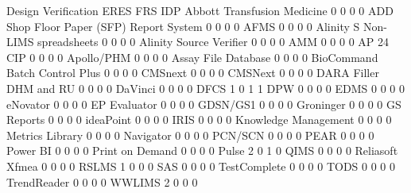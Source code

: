 \documentclass{article}
\begin{document}
\begin{Schunk}
\begin{Soutput}
                                           Design Verification ERES FRS IDP
  Abbott Transfusion Medicine                                0    0   0   0
  ADD Shop Floor Paper (SFP) Report System                   0    0   0   0
  AFMS                                                       0    0   0   0
  Alinity S Non-LIMS spreadsheets                            0    0   0   0
  Alinity Source Verifier                                    0    0   0   0
  AMM                                                        0    0   0   0
  AP 24 CIP                                                  0    0   0   0
  Apollo/PHM                                                 0    0   0   0
  Assay File Database                                        0    0   0   0
  BioCommand Batch Control Plus                              0    0   0   0
  CMSnext                                                    0    0   0   0
  CMSNext                                                    0    0   0   0
  DARA Filler DHM and RU                                     0    0   0   0
  DaVinci                                                    0    0   0   0
  DFCS                                                       1    0   1   1
  DPW                                                        0    0   0   0
  EDMS                                                       0    0   0   0
  eNovator                                                   0    0   0   0
  EP Evaluator                                               0    0   0   0
  GDSN/GS1                                                   0    0   0   0
  Groninger                                                  0    0   0   0
  GS Reports                                                 0    0   0   0
  ideaPoint                                                  0    0   0   0
  IRIS                                                       0    0   0   0
  Knowledge Management                                       0    0   0   0
  Metrics Library                                            0    0   0   0
  Navigator                                                  0    0   0   0
  PCN/SCN                                                    0    0   0   0
  PEAR                                                       0    0   0   0
  Power BI                                                   0    0   0   0
  Print on Demand                                            0    0   0   0
  Pulse                                                      2    0   1   0
  QIMS                                                       0    0   0   0
  Reliasoft Xfmea                                            0    0   0   0
  RSLMS                                                      1    0   0   0
  SAS                                                        0    0   0   0
  TestComplete                                               0    0   0   0
  TODS                                                       0    0   0   0
  TrendReader                                                0    0   0   0
  WWLIMS                                                     2    0   0   0
                                          

\end{Soutput}
\end{Schunk}
\end{document}
